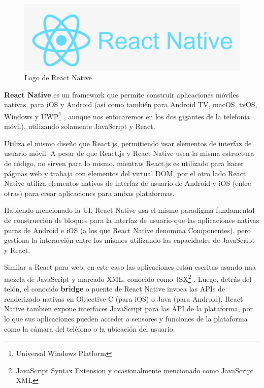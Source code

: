 \begin{figure}[h!]
\begin{center}
\includegraphics[scale=0.5]{Graphics/images/LogodeReactNative.jpg}
\caption{Logo de React Native}
\label{fig:dh}

\end{center}
\end{figure}


\textbf{React Native} es un framework que permite construir aplicaciones móviles nativas, para iOS y Android (así como también para Android TV, macOS, tvOS, Windows y UWP\footnote{Universal Windows Platform}  , aunque nos enfocaremos en los dos gigantes de la telefonía móvil), utilizando solamente JavaScript y React.

Utiliza el mismo diseño que React.js, permitiendo usar elementos de interfaz de usuario móvil. A pesar de que React.js y React Native usen la misma estructura de código, no sirven para lo mismo, mientras React.js es utilizado para hacer páginas web y trabaja con elementos del virtual DOM, por el otro lado React Native utiliza elementos nativos de interfaz de usuario de Android y iOS (entre otras) para crear aplicaciones para ambas plataformas.

Habiendo mencionado la UI, React Native usa el mismo paradigma fundamental de construcción de bloques para la interfaz de usuario que las aplicaciones nativas puras de Android e iOS (a los que React Native denomina Componentes), pero gestiona la interacción entre los mismos utilizando las capacidades de JavaScript y React.

Similar a React para web, en este caso las aplicaciones están escritas usando una mezcla de JavaScript y marcado XML, conocido como JSX\footnote{JavaScript Syntax Extension y ocasionalmente mencionado como JavaScript XML} . Luego, detrás del telón, el conocido \textbf{bridge} o puente de React Native invoca las APIs de renderizado nativas en Objective-C (para iOS) o Java (para Android). React Native también expone interfaces JavaScript para las API de la plataforma, por lo que sus aplicaciones pueden acceder a sensores y funciones de la plataforma como la cámara del teléfono o la ubicación del usuario.

